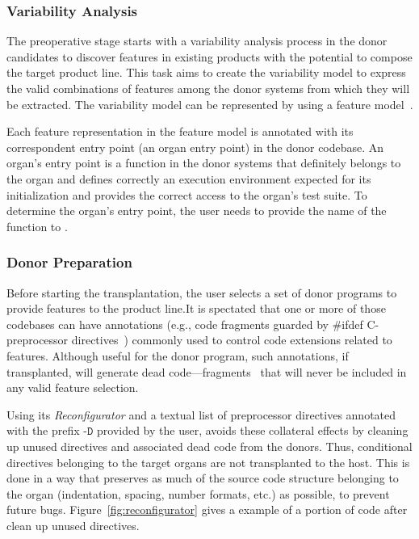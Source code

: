 \subsubsection{Variability Analysis}

The preoperative stage starts with a variability analysis process in the donor candidates to discover features in existing products with the potential to compose the target product line. This task aims to create the variability model to express the valid combinations of features among the donor systems from which they will be extracted.  The variability model can be represented by using a feature model~\cite{Kang1990}.

Each feature representation in the feature model is annotated with 
its correspondent entry point (an organ entry point) in the donor codebase. An organ's entry point is a function in the donor systems that definitely belongs to the organ and defines correctly an execution environment expected for its initialization and provides the correct access to the organ's test suite. To determine the organ’s entry point, the user needs to provide the name of the function to \autoscalpel. 

\subsubsection{Donor Preparation}

Before starting the transplantation, the user selects a set of donor programs to provide features to the product line.It is spectated that one or more of those codebases can have annotations (e.g., code fragments guarded by \#ifdef C-preprocessor directives~\cite{Tartler2011})  commonly used to control code extensions related to features. Although useful for the donor program, such annotations, if transplanted, will generate dead code—fragments~\cite{Tartler2011} that will never be included in any valid feature selection. 

Using its \emph{Reconfigurator} and a textual list of preprocessor directives annotated with the prefix $\texttt{-D}$ provided by the user, \autoscalpel avoids these collateral effects by cleaning up unused directives and associated dead code from the donors. Thus, conditional directives belonging to the target organs are not transplanted to the host. This is done in a way that preserves as much of the source code structure belonging to the organ (indentation, spacing, number formats, etc.) as possible, to prevent future bugs. Figure~\ref{fig:reconfigurator} gives a example of a portion of code after \autoscalpel clean up unused directives.

